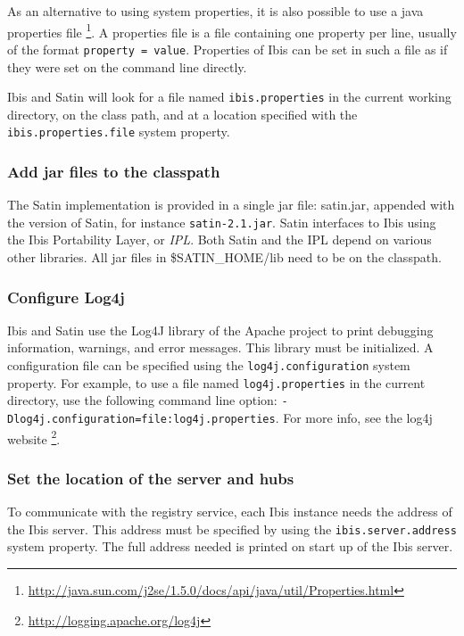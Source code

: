 \documentclass[a4paper,10pt]{article}
\begin{document}
As an alternative to using system properties, it is also possible to use
a java properties file
\footnote{\url{http://java.sun.com/j2se/1.5.0/docs/api/java/util/Properties.html}}.
A properties file is a file containing one property per line, usually of
the format \texttt{property = value}. Properties of Ibis can be set in
such a file as if they were set on the command line directly.

Ibis and Satin will look for a file named \texttt{ibis.properties} in the
current working directory, on the class path, and at a location specified
with the \texttt{ibis.properties.file} system property.

\subsubsection{Add jar files to the classpath}

The Satin implementation is provided in a single jar file: satin.jar,
appended with the version of Satin, for instance \texttt{satin-2.1.jar}.
Satin interfaces to Ibis using the Ibis Portability Layer, or
\emph{IPL}. Both Satin and the IPL depend on various other libraries.
All jar files in \$SATIN\_HOME/lib need to be on the classpath.

\subsubsection{Configure Log4j}

Ibis and Satin use the Log4J library of the Apache project to print debugging
information, warnings, and error messages. This library must be
initialized. A configuration file can be specified using the
\texttt{log4j.configuration} system property. For example, to use a file
named \texttt{log4j.properties} in the current directory, use the
following command line option:
\texttt{-Dlog4j.configuration=file:log4j.properties}. For more info,
see the log4j website \footnote{\url{http://logging.apache.org/log4j}}.

\subsubsection{Set the location of the server and hubs}

To communicate with the registry service, each Ibis instance needs the address
of the Ibis server. This address must be specified by using the
\texttt{ibis.server.address} system property. The full address needed is
printed on start up of the Ibis server.
\end{document}
